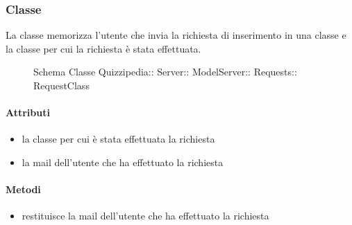 \subsubsection{Classe }
La classe memorizza l'utente che invia la richiesta di inserimento in una classe e la classe per cui la richiesta è stata effettuata.
\begin{figure}[H]
\centering
\noindent{}
\caption[Schema Classe RequestClass]{Schema Classe Quizzipedia:: Server:: ModelServer:: Requests:: RequestClass}
\end{figure}
\paragraph{Attributi}
\begin{itemize}
\item {}
\newline
la classe per cui è stata effettuata la richiesta
\item {}
\newline
la mail dell'utente che ha effettuato la richiesta
\end{itemize}
\paragraph{Metodi}
\begin{itemize}
\item {}
\newline
restituisce la mail dell'utente che ha effettuato la richiesta
\newline
\end{itemize}
